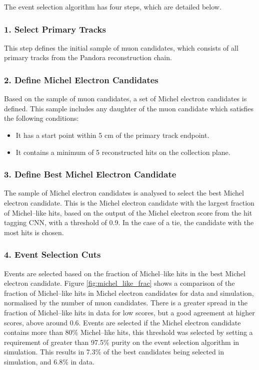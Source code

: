\newpage\noindent
The event selection algorithm has four steps, which are detailed below.
\subsubsection*{1. Select Primary Tracks}
This step defines the initial sample of muon candidates, which consists of all
primary tracks from the Pandora reconstruction chain.

\subsubsection*{2. Define Michel Electron Candidates}
Based on the sample of muon candidates, a set of Michel electron candidates is
defined. This sample includes any daughter of the muon candidate which satisfies
the following conditions:
\begin{itemize}
	\item It has a start point within 5 cm of the primary track endpoint.
	\item It contains a minimum of 5 reconstructed hits on the collection plane.
\end{itemize}

\subsubsection*{3. Define Best Michel Electron Candidate}
The sample of Michel electron candidates is analysed to select the best Michel
electron candidate. This is the Michel electron candidate with the largest
fraction of Michel--like hits, based on the output of the Michel electron score
from the hit tagging CNN, with a threshold of 0.9. In the case of a tie, the 
candidate with the most hits is chosen.

\subsubsection*{4. Event Selection Cuts}
Events are selected based on the fraction of Michel--like hits in the best 
Michel electron candidate. Figure \ref{fig:michel_like_frac} shows a comparison 
of the fraction of Michel--like hits in Michel electron candidates for 
\protodune{} data and simulation, normalised by the number of muon candidates. 
There is a greater spread in the fraction of Michel--like hits in 
data for low scores, but a good agreement at higher scores, above around 0.6. 
Events are selected if the Michel electron candidate contains more than 80\% 
Michel--like hits, this threshold was selected by setting a requirement of 
greater than 97.5\% purity on the event selection algorithm in simulation. This 
results in 7.3\% of the best candidates being selected in simulation, and 6.8\% 
in data.


